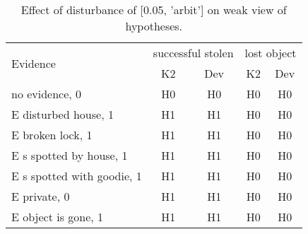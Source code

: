\begin{table}\begin{tabular}{l|cc|cc}\toprule\multirow{2}{*}{Evidence} & \multicolumn{2}{c}{successful stolen}& \multicolumn{2}{c}{lost object}\\& {K2} & {Dev}& {K2} & {Dev}\\\midrule
no evidence, 0 & H0&H0&H0&H0\\E disturbed house, 1 & H1&H1&H0&H0\\E broken lock, 1 & H1&H1&H0&H0\\E s spotted by house, 1 & H1&H1&H0&H0\\E s spotted with goodie, 1 & H1&H1&H0&H0\\E private, 0 & H1&H1&H0&H0\\E object is gone, 1 & H1&H1&H0&H0\\\bottomrule\end{tabular}\caption{Effect of disturbance of [0.05, 'arbit'] on weak view of hypotheses.}\end{table}